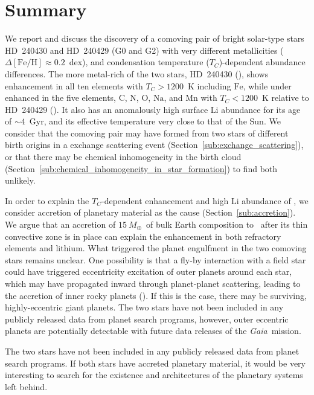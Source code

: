 \documentclass[modern, letterpaper]{aastex61}
\newcommand{\project}[1]{\textsl{#1}}
\newcommand{\gaia}{\project{Gaia}}
\newcommand{\sectionname}{Section}
\newcommand*\elem[1]{\ensuremath{\mathrm{#1}}}
\newcommand*\elemH[1]{\ensuremath{[\mathrm{#1}/\elem{H}]}}
\newcommand*{\feh}{\ensuremath{\elemH{Fe}}}
\newcommand{\sunanalog}{\text{Krios}}
\newcommand{\bizarreone}{\text{Kronos}}
\newcommand{\Tcondens}{\ensuremath{T_C}}
\newcommand{\mearth}{\ensuremath{M_\oplus}}
\newcommand{\maccreted}{\ensuremath{15~\mearth}}
\begin{document}
\section{Summary}
\label{sec:summary}

We report and discuss the discovery of a comoving pair of bright
solar-type stars HD~240430 and HD~240429 (G0 and G2) with very different
metallicities ($\Delta\feh \approx 0.2$~dex), and condensation temperature
(\Tcondens)-dependent abundance differences.
The more metal-rich of the two stars, HD~240430 (\bizarreone), shows enhancement in
all ten elements with $\Tcondens > 1200$~K including \elem{Fe}, while under
enhanced in the five elements, \elem{C}, \elem{N}, \elem{O}, \elem{Na}, and
\elem{Mn} with $\Tcondens < 1200$~K relative to HD~240429 (\sunanalog).
It also has an anomalously high surface \elem{Li} abundance for its age of
$\sim 4$~Gyr, and its effective temperature very close to that of the Sun.
We consider that the comoving pair may have formed from two stars of different
birth origins in a exchange scattering event
(\sectionname~\ref{sub:exchange_scattering}), or that there may be chemical
inhomogeneity in the birth cloud
(\sectionname~\ref{sub:chemical_inhomogeneity_in_star_formation}) to find
both unlikely.

In order to explain the $\Tcondens$-dependent enhancement and high \elem{Li}
abundance of \bizarreone, we consider accretion of planetary material as the
cause (\sectionname~\ref{sub:accretion}).
We argue that an accretion of \maccreted\ of bulk Earth composition to
\bizarreone\ after its thin convective zone is in place can explain the
enhancement in both refractory elements and lithium.
What triggered the planet engulfment in the two comoving stars remains unclear.
One possibility is that a fly-by interaction with a field star could have
triggered eccentricity excitation of outer planets around each star, which may
have propagated inward through planet-planet scattering, leading to the
accretion of inner rocky planets (\citealt{Zakamska:2004aa,Malmberg:2011aa}).
If this is the case, there may be surviving, highly-eccentric giant planets.
The two stars have not been included in any publicly released data from planet
search programs, however, outer eccentric planets are potentially detectable
with future data releases of the \gaia\ mission.

The two stars have not been included in any publicly released data from planet
search programs.
If both stars have accreted planetary material, it would be very interesting to
search for the existence and architectures of the planetary systems left
behind.
\end{document}
